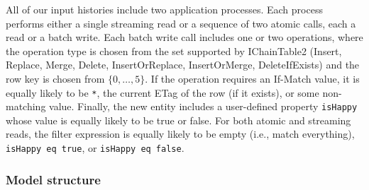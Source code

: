 All of our input histories include two application processes.  Each process performs either a single streaming read or a sequence of two atomic calls, each a read or a batch write.  Each batch write call includes one or two operations, where the operation type is chosen from the set supported by IChainTable2 (Insert, Replace, Merge, Delete, InsertOrReplace, InsertOrMerge, DeleteIfExists) and the row key is chosen from $\{0, \ldots, 5\}$.  If the operation requires an If-Match value, it is equally likely to be \texttt{*}, the current ETag of the row (if it exists), or some non-matching value.  Finally, the new entity includes a user-defined property \texttt{isHappy} whose value is equally likely to be true or false.  For both atomic and streaming reads, the filter expression is equally likely to be empty (i.e., match everything), \texttt{isHappy eq true}, or \texttt{isHappy eq false}.

\subsubsection{Model structure}

